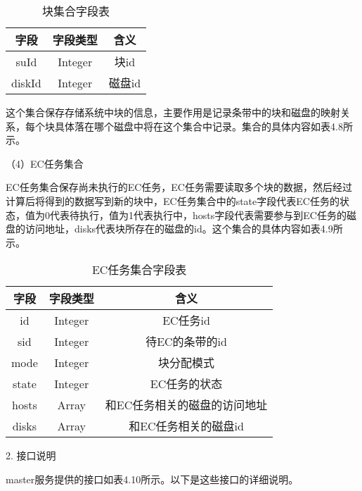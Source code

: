 \begin{table}[h]
    \centering
    \vspace{10pt}
    \caption{块集合字段表}
    \vspace{-15pt}
    \begin{tabular}{ccc}
      \toprule
      字段   & 字段类型   & 含义                   \\
      \midrule
      suId     & Integer   & 块id                 \\
      diskId   & Integer   & 磁盘id                \\
      \bottomrule
    \end{tabular}
\end{table}

这个集合保存存储系统中块的信息，主要作用是记录条带中的块和磁盘的映射关系，每个块具体落在哪个磁盘中将在这个集合中记录。集合的具体内容如表4.8所示。

（4）EC任务集合

EC任务集合保存尚未执行的EC任务，EC任务需要读取多个块的数据，然后经过计算后将得到的数据写到新的块中，EC任务集合中的state字段代表EC任务的状态，值为0代表待执行，值为1代表执行中，hosts字段代表需要参与到EC任务的磁盘的访问地址，disks代表块所存在的磁盘的id。这个集合的具体内容如表4.9所示。

\begin{table}[h]
    \centering
    \vspace{10pt}
    \caption{EC任务集合字段表}
    \vspace{-15pt}
    \begin{tabular}{ccc}
      \toprule
      字段   & 字段类型   & 含义                          \\
      \midrule
      id     & Integer & EC任务id                 \\
      sid    & Integer & 待EC的条带的id                \\
      mode   & Integer & 块分配模式                 \\
      state  & Integer & EC任务的状态                \\
      hosts  & Array   & 和EC任务相关的磁盘的访问地址  \\
      disks  & Array   & 和EC任务相关的磁盘id         \\
      \bottomrule
    \end{tabular}
\end{table}

2. 接口说明

master服务提供的接口如表4.10所示。以下是这些接口的详细说明。


